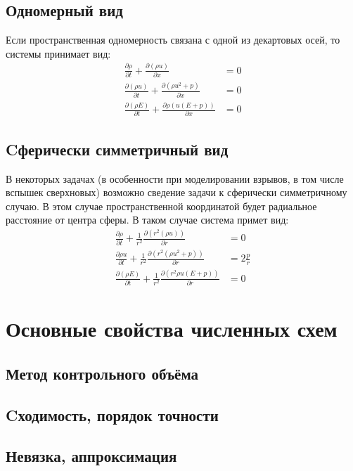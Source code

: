 \documentclass[a4paper,12pt]{extarticle}
\begin{document}
\subsection{Одномерный вид}
    Если пространственная одномерность связана с одной из декартовых осей, то системы принимает вид:
    \begin{align}
        \frac{\partial \rho}{\partial t} + \frac{\partial (\rho u)}{\partial x} &= 0 \\
        \frac{\partial (\rho u)}{\partial t} + \frac{\partial (\rho u^2 + p)}{\partial x} &= 0 \\
        \frac{ \partial (\rho E)}{\partial t} + \frac{\partial \rho (u(E+p))}{\partial x} &= 0
    \end{align}

\subsection{Cферически симметричный вид}
    В некоторых задачах (в особенности при моделировании взрывов, в том числе вспышек сверхновых) возможно сведение задачи к сферически симметричному случаю. В этом случае пространственной координатой будет радиальное расстояние от центра сферы. В таком случае система примет вид:
    \begin{align}
        \frac{\partial \rho}{\partial t} + \frac{1}{r^2}\frac{\partial (r^2 (\rho u))}{\partial r} &= 0 \\
        \frac{\partial \rho u}{\partial t} + \frac{1}{r^2}\frac{\partial (r^2(\rho u^2+p))}{\partial r} &= 2\frac{p}{r} \\
        \frac{\partial (\rho E)}{\partial t} + \frac{1}{r^2}\frac{\partial(r^2 \rho u( E + p))}{\partial r} &= 0
    \end{align}

\section{Основные свойства численных схем}
\subsection{Метод контрольного объёма}
\subsection{Cходимость, порядок точности}
\subsection{Невязка, аппроксимация}
\end{document}
